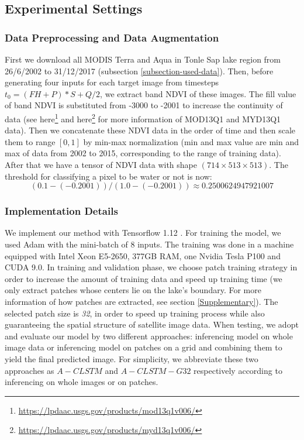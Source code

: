 \subsection{Experimental Settings}
\subsubsection{Data Preprocessing and Data Augmentation}
First we download all MODIS Terra and Aqua in Tonle Sap lake region from 26/6/2002 to 31/12/2017 (subsection \ref{subsection-used-data}). Then, before generating four inputs for each target image from timesteps $t_0 = (FH + P)*S + Q/2$, we extract band NDVI of these images. The fill value of band NDVI is substituted from -3000 to -2001 to increase the continuity of data (see here\footnote{\url{https://lpdaac.usgs.gov/products/mod13q1v006/}} and here\footnote{\url{https://lpdaac.usgs.gov/products/myd13q1v006/}} for more information of MOD13Q1 and MYD13Q1 data). Then we concatenate these NDVI data in the order of time and then scale them to range $[0,1]$ by min-max normalization (min and max value are min and max of data from 2002 to 2015, corresponding to the range of training data). After that we have a tensor of NDVI data with shape $(714 \times 513 \times 513)$. The threshold for classifying a pixel to be water or not is now:
\[(0.1 - (-0.2001)) / (1.0 -(-0.2001)) \approx 0.2500624947921007
\] 

\subsubsection{Implementation Details}
We implement our method with Tensorflow 1.12 \cite{tensorflow2015-whitepaper}. For training the model, we used Adam \cite{article:Adam-optimization} with the mini-batch of 8 inputs. The training was done in a machine equipped with Intel Xeon E5-2650, 377GB RAM, one Nvidia Tesla P100 and CUDA 9.0. In training and validation phase, we choose patch training strategy in order to increase the amount of training data and speed up training time (we only extract patches whose centers lie on the lake's boundary. For more information of how patches are extracted, see section \ref{Supplementary}). The selected patch size is \textit{32}, in order to speed up training process while also guaranteeing the spatial structure of satellite image data. When testing, we adopt and evaluate our model by two different approaches: inferencing model on whole image data or inferencing model on patches on a grid and combining them to yield the final predicted image. For simplicity, we abbreviate these two approaches as $A-CLSTM$ and $A-CLSTM-G32$ respectively according to inferencing on whole images or on patches.  

